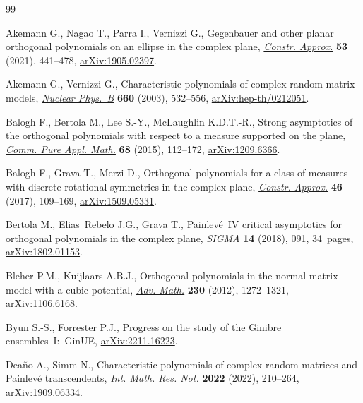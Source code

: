 \documentclass[pdftex]{sigma}
\numberwithin{equation}{section}
\begin{document}
\begin{thebibliography}{99}
\footnotesize\itemsep=0pt

Akemann G., Nagao T., Parra I., Vernizzi G., Gegenbauer and other planar
 orthogonal polynomials on an ellipse in the complex plane, \href{https://doi.org/10.1007/s00365-020-09515-0}{\textit{Constr.
 Approx.}} \textbf{53} (2021), 441--478, \href{https://arxiv.org/abs/1905.02397}{arXiv:1905.02397}.

Akemann G., Vernizzi G., Characteristic polynomials of complex random matrix
 models, \href{https://doi.org/10.1016/S0550-3213(03)00221-9}{\textit{Nuclear Phys.~B}} \textbf{660} (2003), 532--556,
 \href{https://arxiv.org/abs/hep-th/0212051}{arXiv:hep-th/0212051}.

Balogh F., Bertola M., Lee S.-Y., McLaughlin K.D.T.-R., Strong asymptotics of the
 orthogonal polynomials with respect to a measure supported on the plane,
 \href{https://doi.org/10.1002/cpa.21541}{\textit{Comm. Pure Appl. Math.}} \textbf{68} (2015), 112--172,
 \href{https://arxiv.org/abs/1209.6366}{arXiv:1209.6366}.

Balogh F., Grava T., Merzi D., Orthogonal polynomials for a class of measures
 with discrete rotational symmetries in the complex plane, \href{https://doi.org/10.1007/s00365-016-9356-0}{\textit{Constr.
 Approx.}} \textbf{46} (2017), 109--169, \href{https://arxiv.org/abs/1509.05331}{arXiv:1509.05331}.

Bertola M., Elias~Rebelo J.G., Grava T., Painlev\'e~{IV} critical asymptotics
 for orthogonal polynomials in the complex plane, \href{https://doi.org/10.3842/SIGMA.2018.091}{\textit{SIGMA}} \textbf{14}
 (2018), 091, 34~pages, \href{https://arxiv.org/abs/1802.01153}{arXiv:1802.01153}.

Bleher P.M., Kuijlaars A.B.J., Orthogonal polynomials in the normal matrix
 model with a cubic potential, \href{https://doi.org/10.1016/j.aim.2012.03.021}{\textit{Adv. Math.}} \textbf{230} (2012),
 1272--1321, \href{https://arxiv.org/abs/1106.6168}{arXiv:1106.6168}.

Byun S.-S., Forrester P.J., Progress on the study of the {G}inibre
 ensembles~{I}:~{GinUE}, \href{https://arxiv.org/abs/2211.16223}{arXiv:2211.16223}.

Dea\~no A., Simm N., Characteristic polynomials of complex random matrices and
 {P}ainlev\'e transcendents, \href{https://doi.org/10.1093/imrn/rnaa111}{\textit{Int. Math. Res. Not.}} \textbf{2022}
 (2022), 210--264, \href{https://arxiv.org/abs/1909.06334}{arXiv:1909.06334}.


\end{thebibliography}
\end{document}
